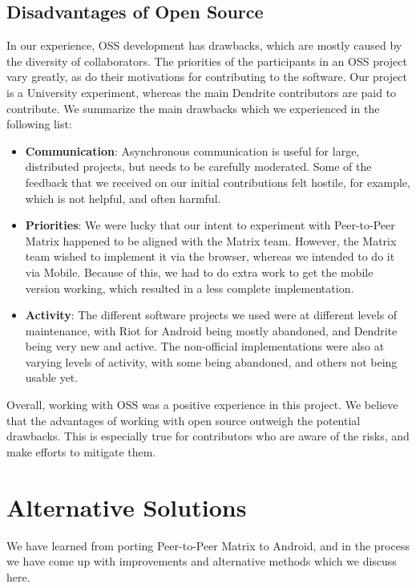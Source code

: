 \subsection{Disadvantages of Open Source}\label{subsec:open_source_disadvantages}
In our experience, \ac{OSS} development has drawbacks, which are mostly caused by the diversity of collaborators.
The priorities of the participants in an \ac{OSS} project vary greatly, as do their motivations for contributing to the software.
Our project is a University experiment, whereas the main Dendrite contributors are paid to contribute.
We summarize the main drawbacks which we experienced in the following list:
\begin{itemize}
	\item{
	      \textbf{Communication}:
	      Asynchronous communication is useful for large, distributed projects, but needs to be carefully moderated.
	      Some of the feedback that we received on our initial contributions felt hostile, for example, which is not helpful, and often harmful.
	      }
	\item{
	      \textbf{Priorities}:
	      We were lucky that our intent to experiment with Peer-to-Peer Matrix happened to be aligned with the Matrix team.
	      However, the Matrix team wished to implement it via the browser, whereas we intended to do it via Mobile.
	      Because of this, we had to do extra work to get the mobile version working, which resulted in a less complete implementation.
	      }
	\item{
	      \textbf{Activity}:
	      The different software projects we used were at different levels of maintenance, with Riot for Android being mostly abandoned, and Dendrite being very new and active.
	      The non-official implementations were also at varying levels of activity, with some being abandoned, and others not being usable yet.
	      }
\end{itemize}

Overall, working with \ac{OSS} was a positive experience in this project.
We believe that the advantages of working with open source outweigh the potential drawbacks.
This is especially true for contributors who are aware of the risks, and make efforts to mitigate them.

\section{Alternative Solutions}\label{sec:alternative_solutions}
We have learned from porting Peer-to-Peer Matrix to Android, and in the process we have come up with improvements and alternative methods which we discuss here.

